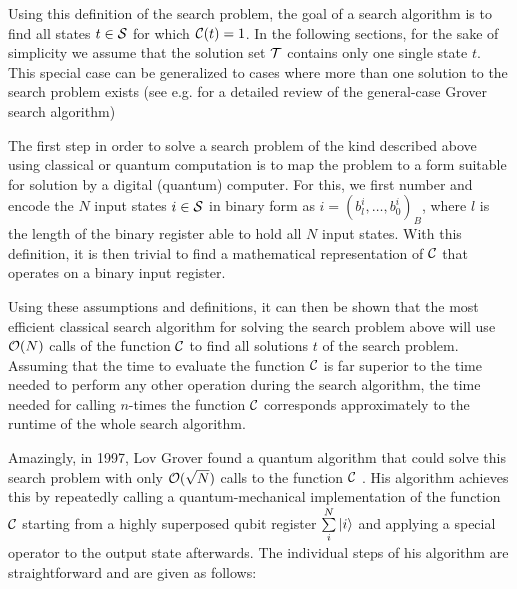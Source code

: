 Using this definition of the search problem, the goal of a search algorithm is to find all states $t\in\begin{mathcal}S\end{mathcal}$ for which $\Or(t) = 1$. In the following sections, for the sake of simplicity we assume that the solution set $\begin{mathcal}T\end{mathcal}$ contains only one single state $t$. This special case can be generalized to cases where more than one solution to the search problem exists (see e.g. \cite{nielsen_quantum_2000} for a detailed review of the general-case Grover search algorithm)

\smallskip

The first step in order to solve a search problem of the kind described above using classical or quantum computation is to map the problem to a form suitable for solution by a digital (quantum) computer. For this, we first number and encode the $N$ input states $i \in \begin{mathcal}S\end{mathcal}$ in binary form as $i=(b^i_l,\hdots,b^i_0)_B$, where $l$ is the length of the binary register able to hold all $N$ input states. With this definition, it is then trivial to find a mathematical representation of $\Or$ that operates on a binary input register. 

\smallskip

Using these assumptions and definitions, it can then be shown that the most efficient classical search algorithm for solving the search problem above will use $\begin{mathcal}O\end{mathcal}(N)$ calls of the function $\Or$ to find all solutions $t$ of the search problem. Assuming that the time to evaluate the function $\Or$ is far superior to the time needed to perform any other operation during the search algorithm, the time needed for calling $n$-times the function $\Or$ corresponds approximately to the runtime of the whole search algorithm.

\smallskip

Amazingly, in 1997, Lov Grover found a quantum algorithm that could solve this search problem with only $\begin{mathcal}O\end{mathcal}(\sqrt{N})$ calls to the function $\Or$ \citep{Grover_Quantum_1997}. His algorithm achieves this by repeatedly calling a quantum-mechanical implementation of the function $\Or$ starting from a highly superposed qubit register $\sum\limits_i^N \left| i \right>$ and applying a special operator to the output state afterwards. The individual steps of his algorithm are straightforward and are given as follows:


